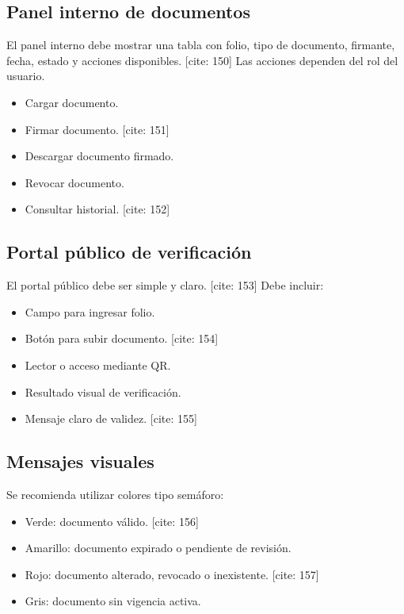 \documentclass[10pt]{article} [cite: 1]
\begin{document}
\subsection{Panel interno de documentos}

El panel interno debe mostrar una tabla con folio, tipo de documento, firmante, fecha, estado y acciones disponibles. [cite: 150] Las acciones dependen del rol del usuario.

\begin{itemize}
    \item Cargar documento.
    \item Firmar documento. [cite: 151]
    \item Descargar documento firmado.
    \item Revocar documento.
    \item Consultar historial. [cite: 152]
\end{itemize}

\subsection{Portal público de verificación}

El portal público debe ser simple y claro. [cite: 153] Debe incluir:

\begin{itemize}
    \item Campo para ingresar folio.
    \item Botón para subir documento. [cite: 154]
    \item Lector o acceso mediante QR.
    \item Resultado visual de verificación.
    \item Mensaje claro de validez. [cite: 155]
\end{itemize}

\subsection{Mensajes visuales}

Se recomienda utilizar colores tipo semáforo:

\begin{itemize}
    \item Verde: documento válido. [cite: 156]
    \item Amarillo: documento expirado o pendiente de revisión.
    \item Rojo: documento alterado, revocado o inexistente. [cite: 157]
    \item Gris: documento sin vigencia activa.
\end{itemize}
\end{document}
